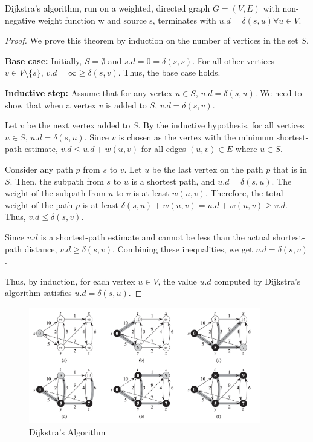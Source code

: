 \begin{theorem}
    Dijkstra’s algorithm, run on a weighted, directed graph $G = (V, E)$ with non-negative weight function w and source s, terminates with $u.d = \delta(s, u) \forall u \in V$.
\end{theorem}
\begin{proof}
    We prove this theorem by induction on the number of vertices in the set $S$.

    \textbf{Base case:} Initially, $S = \emptyset$ and $s.d = 0 = \delta(s, s)$. For all other vertices $v \in V \setminus \{s\}$, $v.d = \infty \geq \delta(s, v)$. Thus, the base case holds.

    \textbf{Inductive step:} Assume that for any vertex $u \in S$, $u.d = \delta(s, u)$. We need to show that when a vertex $v$ is added to $S$, $v.d = \delta(s, v)$.

    Let $v$ be the next vertex added to $S$. By the inductive hypothesis, for all vertices $u \in S$, $u.d = \delta(s, u)$. Since $v$ is chosen as the vertex with the minimum shortest-path estimate, $v.d \leq u.d + w(u, v)$ for all edges $(u, v) \in E$ where $u \in S$.

    Consider any path $p$ from $s$ to $v$. Let $u$ be the last vertex on the path $p$ that is in $S$. Then, the subpath from $s$ to $u$ is a shortest path, and $u.d = \delta(s, u)$. The weight of the subpath from $u$ to $v$ is at least $w(u, v)$. Therefore, the total weight of the path $p$ is at least $\delta(s, u) + w(u, v) = u.d + w(u, v) \geq v.d$. Thus, $v.d \leq \delta(s, v)$.

    Since $v.d$ is a shortest-path estimate and cannot be less than the actual shortest-path distance, $v.d \geq \delta(s, v)$. Combining these inequalities, we get $v.d = \delta(s, v)$.

    Thus, by induction, for each vertex $u \in V$, the value $u.d$ computed by Dijkstra's algorithm satisfies $u.d = \delta(s, u)$.
\end{proof}

\begin{figure}[H]
    \centering
    \includegraphics[width=0.9\textwidth]{assets/dijkstra.png}
    \caption{Dijkstra's Algorithm}
    \label{fig:dijkstra}
\end{figure}

